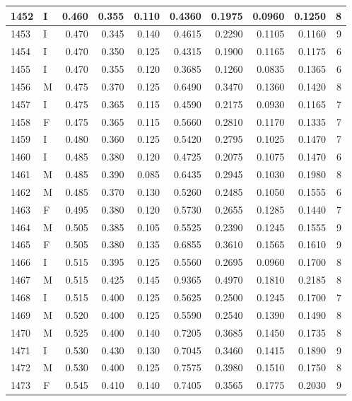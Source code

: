 \documentclass[9pt,twocolumn,twoside,]{pnas-new}
\begin{document}
\begin{tabular}{l|l|r|r|r|r|r|r|r|r}
\hline
1452 & I & 0.460 & 0.355 & 0.110 & 0.4360 & 0.1975 & 0.0960 & 0.1250 & 8\\
\hline
1453 & I & 0.470 & 0.345 & 0.140 & 0.4615 & 0.2290 & 0.1105 & 0.1160 & 9\\
\hline
1454 & I & 0.470 & 0.350 & 0.125 & 0.4315 & 0.1900 & 0.1165 & 0.1175 & 6\\
\hline
1455 & I & 0.470 & 0.355 & 0.120 & 0.3685 & 0.1260 & 0.0835 & 0.1365 & 6\\
\hline
1456 & M & 0.475 & 0.370 & 0.125 & 0.6490 & 0.3470 & 0.1360 & 0.1420 & 8\\
\hline
1457 & I & 0.475 & 0.365 & 0.115 & 0.4590 & 0.2175 & 0.0930 & 0.1165 & 7\\
\hline
1458 & F & 0.475 & 0.365 & 0.115 & 0.5660 & 0.2810 & 0.1170 & 0.1335 & 7\\
\hline
1459 & I & 0.480 & 0.360 & 0.125 & 0.5420 & 0.2795 & 0.1025 & 0.1470 & 7\\
\hline
1460 & I & 0.485 & 0.380 & 0.120 & 0.4725 & 0.2075 & 0.1075 & 0.1470 & 6\\
\hline
1461 & M & 0.485 & 0.390 & 0.085 & 0.6435 & 0.2945 & 0.1030 & 0.1980 & 8\\
\hline
1462 & M & 0.485 & 0.370 & 0.130 & 0.5260 & 0.2485 & 0.1050 & 0.1555 & 6\\
\hline
1463 & F & 0.495 & 0.380 & 0.120 & 0.5730 & 0.2655 & 0.1285 & 0.1440 & 7\\
\hline
1464 & M & 0.505 & 0.385 & 0.105 & 0.5525 & 0.2390 & 0.1245 & 0.1555 & 9\\
\hline
1465 & F & 0.505 & 0.380 & 0.135 & 0.6855 & 0.3610 & 0.1565 & 0.1610 & 9\\
\hline
1466 & I & 0.515 & 0.395 & 0.125 & 0.5560 & 0.2695 & 0.0960 & 0.1700 & 8\\
\hline
1467 & M & 0.515 & 0.425 & 0.145 & 0.9365 & 0.4970 & 0.1810 & 0.2185 & 8\\
\hline
1468 & I & 0.515 & 0.400 & 0.125 & 0.5625 & 0.2500 & 0.1245 & 0.1700 & 7\\
\hline
1469 & M & 0.520 & 0.400 & 0.125 & 0.5590 & 0.2540 & 0.1390 & 0.1490 & 8\\
\hline
1470 & M & 0.525 & 0.400 & 0.140 & 0.7205 & 0.3685 & 0.1450 & 0.1735 & 8\\
\hline
1471 & I & 0.530 & 0.430 & 0.130 & 0.7045 & 0.3460 & 0.1415 & 0.1890 & 9\\
\hline
1472 & M & 0.530 & 0.400 & 0.125 & 0.7575 & 0.3980 & 0.1510 & 0.1750 & 8\\
\hline
1473 & F & 0.545 & 0.410 & 0.140 & 0.7405 & 0.3565 & 0.1775 & 0.2030 & 9\\

\end{tabular}
\end{document}
